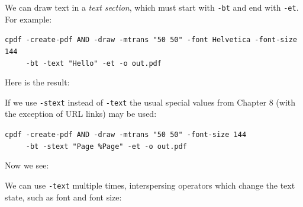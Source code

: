 \documentclass{book}
\begin{document}
We can draw text in a \textit{text section}, which must start with \texttt{-bt} and end with \texttt{-et}. For example:

\begin{framed}
 \noindent\small\verb?cpdf -create-pdf AND -draw -mtrans "50 50" -font Helvetica -font-size 144?\\
 \noindent\small\verb?     -bt -text "Hello" -et -o out.pdf?
\end{framed}

\noindent Here is the result:

\bigskip
{}
\bigskip

\noindent If we use \texttt{-stext} instead of \texttt{-text} the usual special values from Chapter 8 (with the exception of URL links) may be used:

\begin{framed}
 \noindent\small\verb?cpdf -create-pdf AND -draw -mtrans "50 50" -font-size 144?\\
 \noindent\small\verb?     -bt -stext "Page %Page" -et -o out.pdf?
\end{framed}

\noindent Now we see:

\bigskip
{}
\bigskip

\noindent We can use \texttt{-text} multiple times, interspersing operators which change the text state, such as font and font size:
\end{document}
